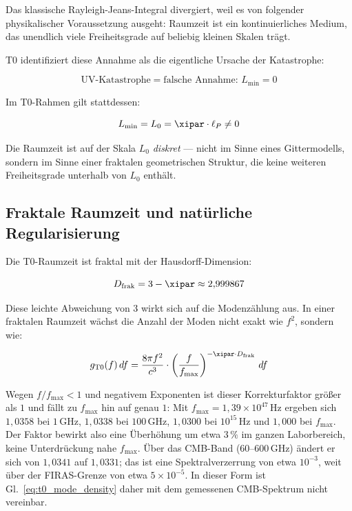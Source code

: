 Das klassische Rayleigh-Jeans-Integral divergiert, weil es von folgender 
physikalischer Voraussetzung ausgeht: Raumzeit ist ein kontinuierliches Medium, das 
unendlich viele Freiheitsgrade auf beliebig kleinen Skalen trägt.

T0 identifiziert diese Annahme als die eigentliche Ursache der Katastrophe:

\begin{equation}
    \text{UV-Katastrophe} = \text{falsche Annahme: } L_{\min} = 0
\end{equation}

Im T0-Rahmen gilt stattdessen:

\begin{equation}
    L_{\min} = L_0 = \xipar \cdot \ell_P \neq 0
\end{equation}

Die Raumzeit ist auf der Skala $L_0$ \emph{diskret} — nicht im Sinne eines 
Gittermodells, sondern im Sinne einer fraktalen geometrischen Struktur, die keine 
weiteren Freiheitsgrade unterhalb von $L_0$ enthält.

\subsection{Fraktale Raumzeit und natürliche Regularisierung}

Die T0-Raumzeit ist fraktal mit der Hausdorff-Dimension:

\begin{equation}
    D_{\text{frak}} = 3 - \xipar \approx 2{,}999867
    \label{eq:fractal_dim}
\end{equation}

Diese leichte Abweichung von 3 wirkt sich auf die Modenzählung aus. In einer fraktalen 
Raumzeit wächst die Anzahl der Moden nicht exakt wie $f^2$, sondern wie:

\begin{equation}
    g_{\text{T0}}(f) \, df = \frac{8\pi f^2}{c^3} \cdot \left(\frac{f}{f_{\max}}\right)^{-\xipar \cdot D_{\text{frak}}} \, df
    \label{eq:t0_mode_density}
\end{equation}

Wegen $f/f_{\max} < 1$ und negativem Exponenten ist dieser Korrekturfaktor größer
als $1$ und fällt zu $f_{\max}$ hin auf genau $1$: Mit $f_{\max} = 1{,}39\times10^{47}$\,Hz
ergeben sich $1{,}0358$ bei $1$\,GHz, $1{,}0338$ bei $100$\,GHz, $1{,}0300$ bei
$10^{15}$\,Hz und $1{,}000$ bei $f_{\max}$. Der Faktor bewirkt also eine Überhöhung um
etwa $3\,\%$ im ganzen Laborbereich, keine Unterdrückung nahe $f_{\max}$. Über das
CMB-Band ($60$--$600$\,GHz) ändert er sich von $1{,}0341$ auf $1{,}0331$; das ist eine
Spektralverzerrung von etwa $10^{-3}$, weit über der FIRAS-Grenze von etwa
$5\times10^{-5}$. In dieser Form ist Gl.~\eqref{eq:t0_mode_density} daher mit dem
gemessenen CMB-Spektrum nicht vereinbar.

